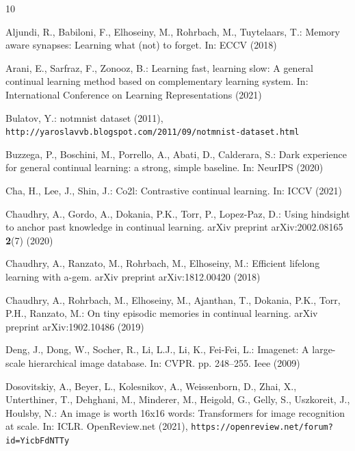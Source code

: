 \documentclass[runningheads]{llncs}
\begin{document}
\clearpage
%
%
\begin{thebibliography}{10}
\providecommand{\url}[1]{\texttt{#1}}
\providecommand{\urlprefix}{URL }
\providecommand{\doi}[1]{https://doi.org/#1}

Aljundi, R., Babiloni, F., Elhoseiny, M., Rohrbach, M., Tuytelaars, T.: Memory
  aware synapses: Learning what (not) to forget. In: ECCV (2018)

Arani, E., Sarfraz, F., Zonooz, B.: Learning fast, learning slow: A general
  continual learning method based on complementary learning system. In:
  International Conference on Learning Representations (2021)

Bulatov, Y.: notmnist dataset (2011),
  \url{http://yaroslavvb.blogspot.com/2011/09/notmnist-dataset.html}

Buzzega, P., Boschini, M., Porrello, A., Abati, D., Calderara, S.: Dark
  experience for general continual learning: a strong, simple baseline. In:
  NeurIPS (2020)

Cha, H., Lee, J., Shin, J.: Co2l: Contrastive continual learning. In: ICCV
  (2021)

Chaudhry, A., Gordo, A., Dokania, P.K., Torr, P., Lopez-Paz, D.: Using
  hindsight to anchor past knowledge in continual learning. arXiv preprint
  arXiv:2002.08165  \textbf{2}(7) (2020)

Chaudhry, A., Ranzato, M., Rohrbach, M., Elhoseiny, M.: Efficient lifelong
  learning with a-gem. arXiv preprint arXiv:1812.00420  (2018)

Chaudhry, A., Rohrbach, M., Elhoseiny, M., Ajanthan, T., Dokania, P.K., Torr,
  P.H., Ranzato, M.: On tiny episodic memories in continual learning. arXiv
  preprint arXiv:1902.10486  (2019)

Deng, J., Dong, W., Socher, R., Li, L.J., Li, K., Fei-Fei, L.: Imagenet: A
  large-scale hierarchical image database. In: CVPR. pp. 248--255. Ieee (2009)

Dosovitskiy, A., Beyer, L., Kolesnikov, A., Weissenborn, D., Zhai, X.,
  Unterthiner, T., Dehghani, M., Minderer, M., Heigold, G., Gelly, S.,
  Uszkoreit, J., Houlsby, N.: An image is worth 16x16 words: Transformers for
  image recognition at scale. In: ICLR. OpenReview.net (2021),
  \url{https://openreview.net/forum?id=YicbFdNTTy}


\end{thebibliography}
\end{document}
